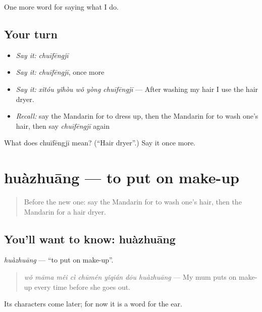 \begin{grammarlens}[title={What you've built}]
One more word for saying what I do.
\end{grammarlens}

\subsection*{Your turn}
\begin{itemize}
\raggedright
  \item \emph{Say it:} \emph{chuīfēngjī}
  \item \emph{Say it:} \emph{chuīfēngjī}, once more
  \item \emph{Say it:} \emph{xǐtóu yǐhòu wǒ yòng chuīfēngjī} — After washing my hair I use the hair dryer.
  \item \emph{Recall:} say the Mandarin for to dress up, then the Mandarin for to wash one's hair, then say \emph{chuīfēngjī} again
\end{itemize}

\begin{tcolorbox}[breakable,colback=teal!4,colframe=teal!35!black,title={Before you move on}]
What does chuīfēngjī mean? (\textquotedblleft{}Hair dryer\textquotedblright{}.) Say it once more.
\end{tcolorbox}
\section[huàzhuāng]{huàzhuāng — to put on make-up}

\label{lesson:ZH-C164-huazhuang}



\begin{quote}
Before the new one: say the Mandarin for to wash one's hair, then the Mandarin for a hair dryer.
\end{quote}

\subsection*{You'll want to know: huàzhuāng}
\emph{huàzhuāng} — \textquotedblleft{}to put on make-up\textquotedblright{}.

\begin{quote}
\emph{wǒ māma měi cì chūmén yǐqián dōu huàzhuāng} — My mum puts on make-up every time before she goes out.
\end{quote}

Its characters come later; for now it is a word for the ear.

